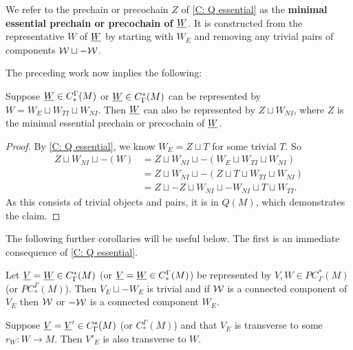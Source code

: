 \begin{definition}\label{D: minimal essential}
We refer to the prechain or precochain $Z$ of \cref{C: Q essential} as the \textbf{minimal essential prechain or precochain of $\underline{W}$}.
It is constructed from the representative $W$ of $\underline{W}$ by starting with $W_E$ and removing any trivial pairs of components $\mathcal{W} \sqcup - \mathcal{W}$.
\end{definition}

The preceding work now implies the following:

\begin{theorem}\label{T: minimal rep}
	Suppose $\underline{W} \in C_*^\Gamma(M)$ or $\underline{W} \in C^*_\Gamma(M)$ can be represented by $W = W_E \sqcup W_{TI} \sqcup W_{NI}$.
	Then $\underline{W}$ can also be represented by $Z \sqcup W_{NI}$, where $Z$ is the minimal essential prechain or precochain of $\underline{W}$.
\end{theorem}
\begin{proof}
	By \cref{C: Q essential}, we know $W_E = Z \sqcup T$ for some trivial $T$.
	So
	\begin{align*}
		Z \sqcup W_{NI} \sqcup -(W) &= 	Z \sqcup W_{NI} \sqcup - (W_E \sqcup W_{TI} \sqcup W_{NI})\\
		&= Z \sqcup W_{NI} \sqcup - (Z \sqcup T \sqcup W_{TI} \sqcup W_{NI})\\
		&= Z \sqcup -Z \sqcup W_{NI} \sqcup - W_{NI} \sqcup T \sqcup W_{TI}.
	\end{align*}
	As this consists of trivial objects and pairs, it is in $Q(M)$, which demonstrates the claim.
\end{proof}

The following further corollaries will be useful below.
The first is an immediate consequence of \cref{C: Q essential}.

\begin{corollary}\label{L: essential}
	Let $\underline{V} = \underline{W} \in C^*_\Gamma(M)$ (or $\underline{V} = \underline{W} \in C_*^\Gamma(M)$) be represented by $V,W \in PC^*_\Gamma(M)$ (or $PC^\Gamma_*(M)$).
	Then $V_E \sqcup -W_E$ is trivial and if $\mathcal{W}$ is a connected component of $V_E$ then $\mathcal{W}$ or $-\mathcal{W}$ is a connected component $W_E$.
\end{corollary}

\begin{corollary}\label{C: essential trans}
	Suppose $\underline{V} = \underline{V}' \in C^*_\Gamma(M)$ (or $C_*^\Gamma(M)$) and that $V_E$ is transverse to some $r_W \colon W \to M$.
	Then $V'_E$ is also transverse to $W$.
\end{corollary}

